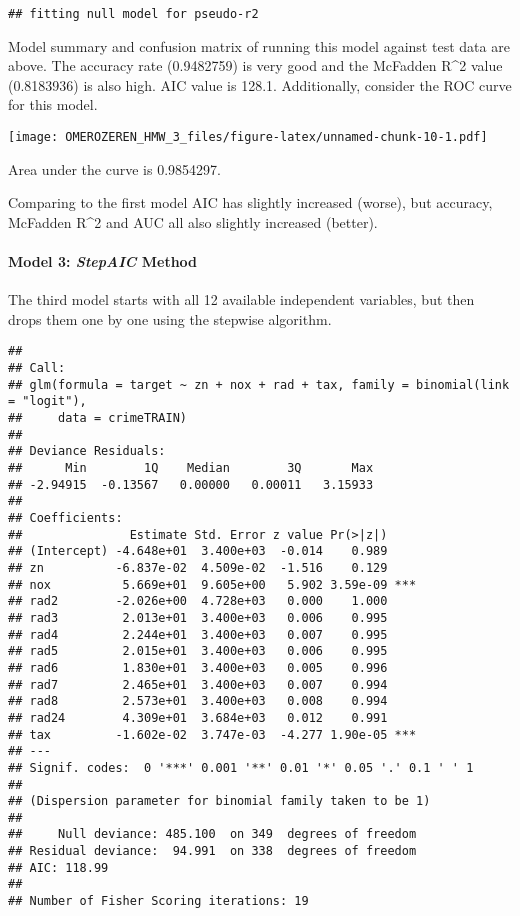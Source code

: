 \documentclass[]{article}
\let\oldparagraph\paragraph
\renewcommand{\paragraph}[1]{\oldparagraph{#1}\mbox{}}
\begin{document}
\begin{verbatim}
## fitting null model for pseudo-r2
\end{verbatim}

Model summary and confusion matrix of running this model against test
data are above. The accuracy rate (0.9482759) is very good and the
McFadden R\^{}2 value (0.8183936) is also high. AIC value is 128.1.
Additionally, consider the ROC curve for this model.

\texttt{[image: OMEROZEREN\_HMW\_3\_files/figure-latex/unnamed-chunk-10-1.pdf]}

Area under the curve is 0.9854297.

Comparing to the first model AIC has slightly increased (worse), but
accuracy, McFadden R\^{}2 and AUC all also slightly increased (better).

\hypertarget{model-3-stepaic-method}{%
\paragraph{\texorpdfstring{Model 3: \emph{StepAIC}
Method}{Model 3: StepAIC Method}}\label{model-3-stepaic-method}}

The third model starts with all 12 available independent variables, but
then drops them one by one using the stepwise algorithm.

\begin{verbatim}
## 
## Call:
## glm(formula = target ~ zn + nox + rad + tax, family = binomial(link = "logit"), 
##     data = crimeTRAIN)
## 
## Deviance Residuals: 
##      Min        1Q    Median        3Q       Max  
## -2.94915  -0.13567   0.00000   0.00011   3.15933  
## 
## Coefficients:
##               Estimate Std. Error z value Pr(>|z|)    
## (Intercept) -4.648e+01  3.400e+03  -0.014    0.989    
## zn          -6.837e-02  4.509e-02  -1.516    0.129    
## nox          5.669e+01  9.605e+00   5.902 3.59e-09 ***
## rad2        -2.026e+00  4.728e+03   0.000    1.000    
## rad3         2.013e+01  3.400e+03   0.006    0.995    
## rad4         2.244e+01  3.400e+03   0.007    0.995    
## rad5         2.015e+01  3.400e+03   0.006    0.995    
## rad6         1.830e+01  3.400e+03   0.005    0.996    
## rad7         2.465e+01  3.400e+03   0.007    0.994    
## rad8         2.573e+01  3.400e+03   0.008    0.994    
## rad24        4.309e+01  3.684e+03   0.012    0.991    
## tax         -1.602e-02  3.747e-03  -4.277 1.90e-05 ***
## ---
## Signif. codes:  0 '***' 0.001 '**' 0.01 '*' 0.05 '.' 0.1 ' ' 1
## 
## (Dispersion parameter for binomial family taken to be 1)
## 
##     Null deviance: 485.100  on 349  degrees of freedom
## Residual deviance:  94.991  on 338  degrees of freedom
## AIC: 118.99
## 
## Number of Fisher Scoring iterations: 19
\end{verbatim}
\end{document}
